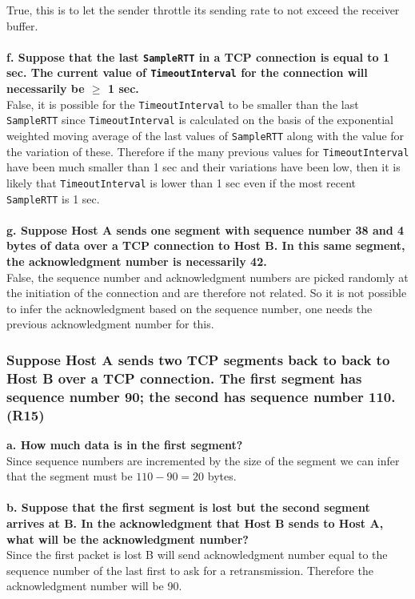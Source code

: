 True, this is to let the sender throttle its sending rate to not exceed the receiver buffer. \\
\\
\textbf{f. Suppose that the last \texttt{SampleRTT} in a TCP connection is equal to 1 sec. The current value of \texttt{TimeoutInterval} for the connection will necessarily be $\geq$ 1 sec.} \\
False, it is possible for the \texttt{TimeoutInterval} to be smaller than the last \texttt{SampleRTT} since \texttt{TimeoutInterval} is calculated on the basis of the exponential weighted moving average of the last values of \texttt{SampleRTT} along with the value for the variation of these. Therefore if the many previous values for \texttt{TimeoutInterval} have been much smaller than 1 sec and their variations have been low, then it is likely that \texttt{TimeoutInterval} is lower than 1 sec even if the most recent \texttt{SampleRTT} is 1 sec. \\
\\
\textbf{g. Suppose Host A sends one segment with sequence number 38 and 4 bytes of data over a TCP connection to Host B. In this same segment, the acknowledgment number is necessarily 42.} \\
False, the sequence number and acknowledgment numbers are picked randomly at the initiation of the connection and are therefore not related. So it is not possible to infer the acknowledgment based on the sequence number, one needs the previous acknowledgment number for this.


\subsubsection{Suppose Host A sends two TCP segments back to back to Host B over a TCP connection. The first segment has sequence number 90; the second has sequence number 110. (R15)}

\textbf{a. How much data is in the first segment?} \\
Since sequence numbers are incremented by the size of the segment we can infer that the segment must be $110 - 90 = 20$ bytes. \\
\\
\textbf{b. Suppose that the first segment is lost but the second segment arrives at B. In the acknowledgment that Host B sends to Host A, what will be the acknowledgment number?} \\
Since the first packet is lost B will send acknowledgment number equal to the sequence number of the last first to ask for a retransmission. Therefore the acknowledgment number will be 90.

